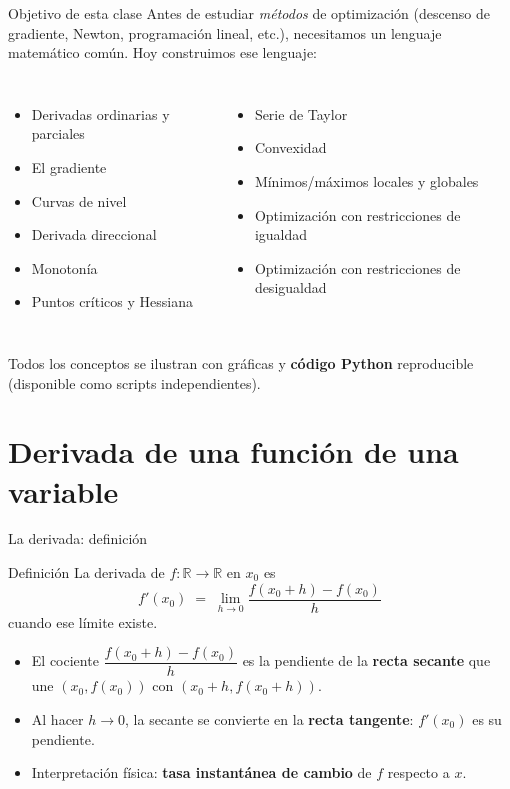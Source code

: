 \documentclass[aspectratio=169,10pt]{beamer}
\newcommand{\R}{\mathbb{R}}
\begin{document}
\begin{frame}{Objetivo de esta clase}
  Antes de estudiar \emph{métodos} de optimización (descenso de gradiente,
  Newton, programación lineal, etc.), necesitamos un lenguaje matemático
  común. Hoy construimos ese lenguaje:
  \begin{columns}
    \begin{itemize}
      \item Derivadas ordinarias y parciales
      \item El gradiente
      \item Curvas de nivel
      \item Derivada direccional
      \item Monotonía
      \item Puntos críticos y Hessiana
    \end{itemize}
    \begin{itemize}
      \item Serie de Taylor
      \item Convexidad
      \item Mínimos/máximos locales y globales
      \item Optimización con restricciones de igualdad
      \item Optimización con restricciones de desigualdad
    \end{itemize}
  \end{columns}
  \vspace{0.3cm}
  \begin{block}{}
    Todos los conceptos se ilustran con gráficas y \textbf{código Python}
    reproducible (disponible como scripts independientes).
  \end{block}
\end{frame}

\section{Derivada de una función de una variable}

\begin{frame}{La derivada: definición}
  \begin{block}{Definición}
    La derivada de $f:\R\to\R$ en $x_0$ es
    \[
      f'(x_0) \;=\; \lim_{h\to 0} \frac{f(x_0+h)-f(x_0)}{h}
    \]
    cuando ese límite existe.
  \end{block}
  \begin{itemize}
    \item El cociente $\dfrac{f(x_0+h)-f(x_0)}{h}$ es la pendiente de la
      \textbf{recta secante} que une $(x_0,f(x_0))$ con $(x_0+h,f(x_0+h))$.
    \item Al hacer $h\to 0$, la secante se convierte en la \textbf{recta
      tangente}: $f'(x_0)$ es su pendiente.
    \item Interpretación física: \textbf{tasa instantánea de cambio} de $f$
      respecto a $x$.
  \end{itemize}
\end{frame}
\end{document}
